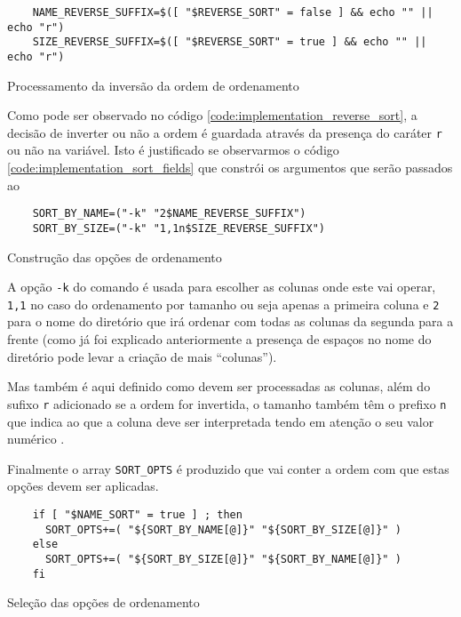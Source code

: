 \begin{listing}[H]
	\centering
	\begin{verbatim}
    NAME_REVERSE_SUFFIX=$([ "$REVERSE_SORT" = false ] && echo "" || echo "r")
    SIZE_REVERSE_SUFFIX=$([ "$REVERSE_SORT" = true ] && echo "" || echo "r")
  \end{verbatim}
	\caption{Processamento da inversão da ordem de ordenamento}
	\label{code:implementation_reverse_sort}
\end{listing}

Como pode ser observado no código \ref{code:implementation_reverse_sort}, a
decisão de inverter ou não a ordem é guardada através da presença do caráter
\Verb|r| ou não na variável. Isto é justificado se observarmos o código
\ref{code:implementation_sort_fields} que constrói os argumentos que serão
passados ao 

\begin{listing}[H]
	\centering
	\begin{verbatim}
    SORT_BY_NAME=("-k" "2$NAME_REVERSE_SUFFIX")
    SORT_BY_SIZE=("-k" "1,1n$SIZE_REVERSE_SUFFIX")
  \end{verbatim}
	\caption{Construção das opções de ordenamento}
	\label{code:implementation_sort_fields}
\end{listing}

A opção \Verb|-k| do comando  é usada para escolher as colunas
onde este vai operar, \Verb|1,1| no caso do ordenamento por tamanho ou seja apenas
a primeira coluna e \Verb|2| para o nome do diretório que irá ordenar com todas
as colunas da segunda para a frente (como já foi explicado anteriormente a
presença de espaços no nome do diretório pode levar a criação de mais
\enquote{colunas}).

Mas também é aqui definido como devem ser processadas as colunas, além do sufixo
\Verb|r| adicionado se a ordem for invertida, o tamanho também têm o prefixo
\Verb|n| que indica ao  que a coluna deve ser interpretada
tendo em atenção o seu valor numérico \cite[3248]{posix}.

Finalmente o array \Verb|SORT_OPTS| é produzido que vai conter a ordem com que
estas opções devem ser aplicadas.

\begin{listing}[H]
	\centering
	\begin{verbatim}
    if [ "$NAME_SORT" = true ] ; then
      SORT_OPTS+=( "${SORT_BY_NAME[@]}" "${SORT_BY_SIZE[@]}" )
    else
      SORT_OPTS+=( "${SORT_BY_SIZE[@]}" "${SORT_BY_NAME[@]}" )
    fi
  \end{verbatim}
	\caption{Seleção das opções de ordenamento}
\end{listing}


